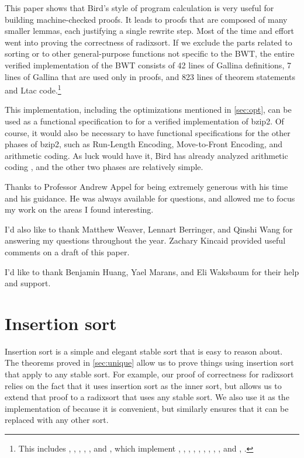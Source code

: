 \documentclass[sigplan,10pt,anonymous,review]{thesis}
\begin{document}
This paper shows that Bird's style of program calculation is very
useful for building machine-checked proofs. It leads to proofs that
are composed of many smaller lemmas, each justifying a single rewrite
step. Most of the time and effort went into proving the correctness of
radixsort. If we exclude the parts related to sorting or to other
general-purpose functions not specific to the BWT, the entire verified
implementation of the BWT consists of 42 lines of Gallina definitions,
7 lines of Gallina that are used only in proofs, and 823 lines of
theorem statements and Ltac code.\footnote{This includes
  , , ,
  , ,  and
  , which implement , ,
  , , , , ,
  , , and , .}

This implementation, including the optimizations mentioned in
\cref{sec:opt}, can be used as a functional specification to for a
verified implementation of bzip2. Of course, it would also be
necessary to have functional specifications for the other phases of
bzip2, such as Run-Length Encoding, Move-to-Front Encoding, and
arithmetic coding. As luck would have it, Bird has already analyzed
arithmetic coding \cite{pearls}, and the other two phases are
relatively simple.

\begin{acks}
Thanks to Professor Andrew Appel for being extremely generous with his
time and his guidance. He was always available for questions, and
allowed me to focus my work on the areas I found interesting.

I'd also like to thank Matthew Weaver, Lennart Berringer, and Qinshi
Wang for answering my questions throughout the year. Zachary Kincaid
provided useful comments on a draft of this paper.

I'd like to thank Benjamin Huang, Yael Marans, and Eli Waksbaum for
their help and support.
\end{acks}



\appendix

\section{Insertion sort}
\label{appendix:insertion_sort}

Insertion sort is a simple and elegant stable sort that is easy to
reason about. The theorems proved in \cref{sec:unique} allow us to
prove things using insertion sort that apply to any stable sort. For
example, our proof of correctness for radixsort relies on the fact
that it uses insertion sort as the inner sort, but
 allows us to extend that proof to a
radixsort that uses any stable sort. We also use it as the
implementation of  because it is convenient, but
similarly  ensures that it can be replaced with
any other sort.
\end{document}
